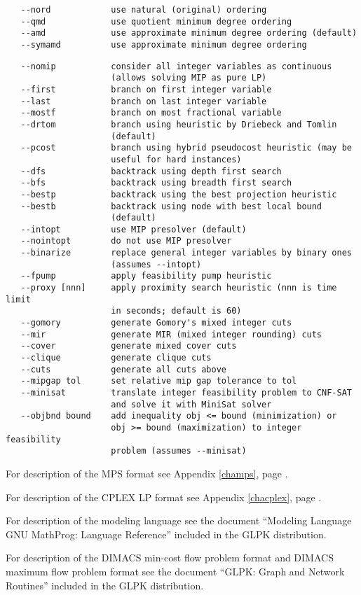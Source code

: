 
\begin{verbatim}
   --nord            use natural (original) ordering
   --qmd             use quotient minimum degree ordering
   --amd             use approximate minimum degree ordering (default)
   --symamd          use approximate minimum degree ordering
\end{verbatim}


\begin{verbatim}
   --nomip           consider all integer variables as continuous
                     (allows solving MIP as pure LP)
   --first           branch on first integer variable
   --last            branch on last integer variable
   --mostf           branch on most fractional variable
   --drtom           branch using heuristic by Driebeck and Tomlin
                     (default)
   --pcost           branch using hybrid pseudocost heuristic (may be
                     useful for hard instances)
   --dfs             backtrack using depth first search
   --bfs             backtrack using breadth first search
   --bestp           backtrack using the best projection heuristic
   --bestb           backtrack using node with best local bound
                     (default)
   --intopt          use MIP presolver (default)
   --nointopt        do not use MIP presolver
   --binarize        replace general integer variables by binary ones
                     (assumes --intopt)
   --fpump           apply feasibility pump heuristic
   --proxy [nnn]     apply proximity search heuristic (nnn is time limit
                     in seconds; default is 60)
   --gomory          generate Gomory's mixed integer cuts
   --mir             generate MIR (mixed integer rounding) cuts
   --cover           generate mixed cover cuts
   --clique          generate clique cuts
   --cuts            generate all cuts above
   --mipgap tol      set relative mip gap tolerance to tol
   --minisat         translate integer feasibility problem to CNF-SAT
                     and solve it with MiniSat solver
   --objbnd bound    add inequality obj <= bound (minimization) or
                     obj >= bound (maximization) to integer feasibility
                     problem (assumes --minisat)
\end{verbatim}

For description of the MPS format see Appendix \ref{champs}, page
\pageref{champs}.

For description of the CPLEX LP format see Appendix \ref{chacplex},
page \pageref{chacplex}.

For description of the modeling language see the document ``Modeling
Language GNU MathProg: Language Reference'' included in the GLPK
distribution.

For description of the DIMACS min-cost flow problem format and DIMACS
maximum flow problem format see the document ``GLPK: Graph and Network
Routines'' included in the GLPK distribution.

